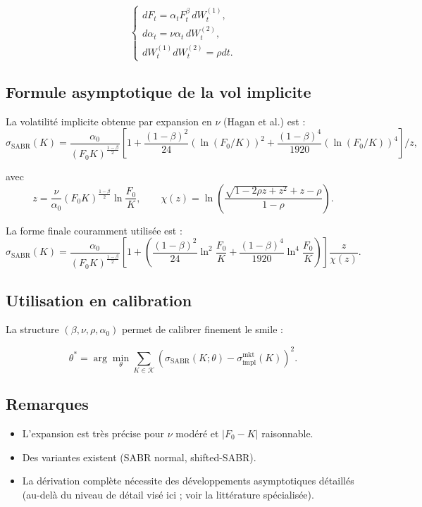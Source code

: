 \documentclass[11pt,a4paper]{article}
\newcommand{\1}{\mathbf{1}}
\begin{document}
\[
\begin{cases}
dF_t = \alpha_t F_t^{\beta} \, dW_t^{(1)}, \\[4pt]
d\alpha_t = \nu \alpha_t \, dW_t^{(2)}, \\[4pt]
dW_t^{(1)}dW_t^{(2)} = \rho dt.
\end{cases}
\]

\subsection*{Formule asymptotique de la vol implicite}

La volatilité implicite obtenue par expansion en $\nu$ (Hagan et al.) est :
\[
\sigma_{\mathrm{SABR}}(K)
=
\frac{\alpha_0}{(F_0 K)^{\frac{1-\beta}{2}}}
\left[
1 + \frac{(1-\beta)^2}{24}(\ln(F_0/K))^2
+ \frac{(1-\beta)^4}{1920}(\ln(F_0/K))^4
\right]
\Bigg/
z,
\]

avec
\[
z = \frac{\nu}{\alpha_0} (F_0 K)^{\frac{1-\beta}{2}} \ln\frac{F_0}{K},
\qquad
\chi(z) = \ln\!\left( \frac{\sqrt{1-2\rho z + z^2} + z - \rho}{1-\rho} \right).
\]

La forme finale couramment utilisée est :
\[
\sigma_{\mathrm{SABR}}(K)
=
\frac{\alpha_0}{(F_0 K)^{\frac{1-\beta}{2}}}
\left[
1
+
\left(
\frac{(1-\beta)^2}{24}\ln^2\frac{F_0}{K}
+
\frac{(1-\beta)^4}{1920}\ln^4\frac{F_0}{K}
\right)
\right]
\frac{z}{\chi(z)}.
\]

\subsection*{Utilisation en calibration}

La structure $(\beta,\nu,\rho,\alpha_0)$ permet de calibrer finement le smile :

\[
\theta^*
=
\arg\min_{\theta}
\sum_{K\in\mathcal{K}}
\left(
\sigma_{\mathrm{SABR}}(K;\theta)
-
\sigma_{\mathrm{impl}}^{\mathrm{mkt}}(K)
\right)^2.
\]

\subsection*{Remarques}

\begin{itemize}
  \item L'expansion est très précise pour $\nu$ modéré et $|F_0-K|$ raisonnable.
  \item Des variantes existent (SABR normal, shifted-SABR).
  \item La dérivation complète nécessite des développements asymptotiques
        détaillés (au-delà du niveau de détail visé ici ; voir la littérature spécialisée).
\end{itemize}
\end{document}

